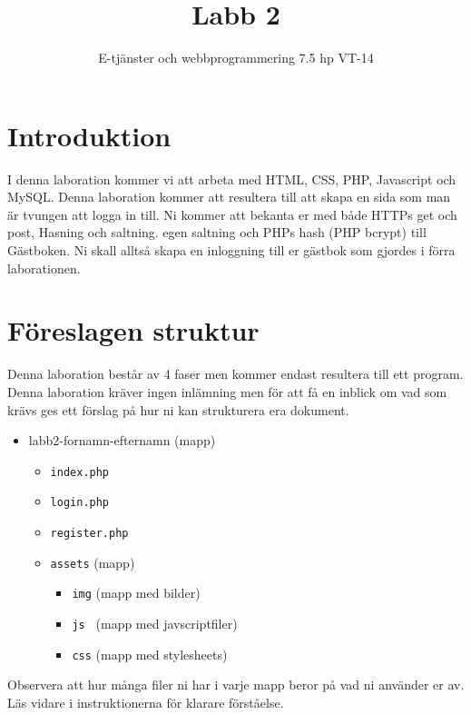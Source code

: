 \documentclass[12pt]{article}
\date{}
\title{ Labb 2 }
\author{ E-tjänster och webbprogrammering 7.5 hp VT-14 }
\begin{document}
\maketitle
\vspace{-2em}



\section{Introduktion}
I denna laboration kommer vi att arbeta med HTML, CSS, PHP, Javascript och MySQL. Denna laboration kommer att resultera till att skapa en sida som man är tvungen att logga in till. Ni kommer att bekanta er med både HTTPs get och post, Hasning och saltning. egen saltning och PHPs hash (PHP bcrypt) till Gästboken. Ni skall alltså skapa en inloggning till er gästbok som gjordes i förra laborationen. 



\section{Föreslagen struktur}
Denna laboration består av 4 faser men kommer endast resultera till ett program. Denna laboration kräver ingen inlämning men för att få en inblick om vad som krävs ges ett förslag på hur ni kan strukturera era dokument.
  \begin{itemize}
    \item labb2-fornamn-efternamn (mapp)
      \begin{itemize}
        \item \texttt{index.php}
        \item \texttt{login.php}
        \item \texttt{register.php}
        \item \texttt{assets} (mapp)
      \begin{itemize}
        \item \texttt{img} (mapp med bilder)
        \item \texttt{js } (mapp med javscriptfiler)
	      \item \texttt{css} (mapp med stylesheets)
      \end{itemize}
    \end{itemize}
  \end{itemize}

Observera att hur många filer ni har i varje mapp beror på vad ni använder er av. Läs vidare i instruktionerna för klarare förståelse.
\end{document}
